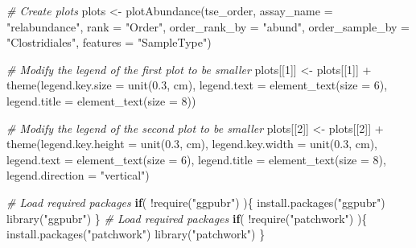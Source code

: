 \documentclass[
]{book}
\newenvironment{Shaded}{\begin{snugshade}}{\end{snugshade}}
\newcommand{\AttributeTok}[1]{\textcolor[rgb]{0.77,0.63,0.00}{#1}}
\newcommand{\CommentTok}[1]{\textcolor[rgb]{0.56,0.35,0.01}{\textit{#1}}}
\newcommand{\ControlFlowTok}[1]{\textcolor[rgb]{0.13,0.29,0.53}{\textbf{#1}}}
\newcommand{\DecValTok}[1]{\textcolor[rgb]{0.00,0.00,0.81}{#1}}
\newcommand{\FloatTok}[1]{\textcolor[rgb]{0.00,0.00,0.81}{#1}}
\newcommand{\FunctionTok}[1]{\textcolor[rgb]{0.00,0.00,0.00}{#1}}
\newcommand{\NormalTok}[1]{#1}
\newcommand{\OtherTok}[1]{\textcolor[rgb]{0.56,0.35,0.01}{#1}}
\newcommand{\SpecialCharTok}[1]{\textcolor[rgb]{0.00,0.00,0.00}{#1}}
\newcommand{\StringTok}[1]{\textcolor[rgb]{0.31,0.60,0.02}{#1}}
\begin{document}
\begin{Shaded}
\begin{Highlighting}[]
\CommentTok{\# Create plots}
\NormalTok{plots }\OtherTok{\textless{}{-}} \FunctionTok{plotAbundance}\NormalTok{(tse\_order,}
            \AttributeTok{assay\_name =} \StringTok{"relabundance"}\NormalTok{,}
        \AttributeTok{rank =} \StringTok{"Order"}\NormalTok{,}
            \AttributeTok{order\_rank\_by =} \StringTok{"abund"}\NormalTok{,}
        \AttributeTok{order\_sample\_by =} \StringTok{"Clostridiales"}\NormalTok{,}
            \AttributeTok{features =} \StringTok{"SampleType"}\NormalTok{)}

\CommentTok{\# Modify the legend of the first plot to be smaller }
\NormalTok{plots[[}\DecValTok{1}\NormalTok{]] }\OtherTok{\textless{}{-}}\NormalTok{ plots[[}\DecValTok{1}\NormalTok{]] }\SpecialCharTok{+}
    \FunctionTok{theme}\NormalTok{(}\AttributeTok{legend.key.size =} \FunctionTok{unit}\NormalTok{(}\FloatTok{0.3}\NormalTok{, }\StringTok{\textquotesingle{}cm\textquotesingle{}}\NormalTok{),}
          \AttributeTok{legend.text =} \FunctionTok{element\_text}\NormalTok{(}\AttributeTok{size =} \DecValTok{6}\NormalTok{),}
          \AttributeTok{legend.title =} \FunctionTok{element\_text}\NormalTok{(}\AttributeTok{size =} \DecValTok{8}\NormalTok{))}

\CommentTok{\# Modify the legend of the second plot to be smaller }
\NormalTok{plots[[}\DecValTok{2}\NormalTok{]] }\OtherTok{\textless{}{-}}\NormalTok{ plots[[}\DecValTok{2}\NormalTok{]] }\SpecialCharTok{+}
    \FunctionTok{theme}\NormalTok{(}\AttributeTok{legend.key.height =} \FunctionTok{unit}\NormalTok{(}\FloatTok{0.3}\NormalTok{, }\StringTok{\textquotesingle{}cm\textquotesingle{}}\NormalTok{),}
          \AttributeTok{legend.key.width =} \FunctionTok{unit}\NormalTok{(}\FloatTok{0.3}\NormalTok{, }\StringTok{\textquotesingle{}cm\textquotesingle{}}\NormalTok{),}
          \AttributeTok{legend.text =} \FunctionTok{element\_text}\NormalTok{(}\AttributeTok{size =} \DecValTok{6}\NormalTok{),}
          \AttributeTok{legend.title =} \FunctionTok{element\_text}\NormalTok{(}\AttributeTok{size =} \DecValTok{8}\NormalTok{),}
          \AttributeTok{legend.direction =} \StringTok{"vertical"}\NormalTok{)}

\CommentTok{\# Load required packages}
\ControlFlowTok{if}\NormalTok{( }\SpecialCharTok{!}\FunctionTok{require}\NormalTok{(}\StringTok{"ggpubr"}\NormalTok{) )\{}
    \FunctionTok{install.packages}\NormalTok{(}\StringTok{"ggpubr"}\NormalTok{)}
    \FunctionTok{library}\NormalTok{(}\StringTok{"ggpubr"}\NormalTok{)}
\NormalTok{\}}
\CommentTok{\# Load required packages}
\ControlFlowTok{if}\NormalTok{( }\SpecialCharTok{!}\FunctionTok{require}\NormalTok{(}\StringTok{"patchwork"}\NormalTok{) )\{}
    \FunctionTok{install.packages}\NormalTok{(}\StringTok{"patchwork"}\NormalTok{)}
    \FunctionTok{library}\NormalTok{(}\StringTok{"patchwork"}\NormalTok{)}
\NormalTok{\}}


\end{Highlighting}
\end{Shaded}
\end{document}
